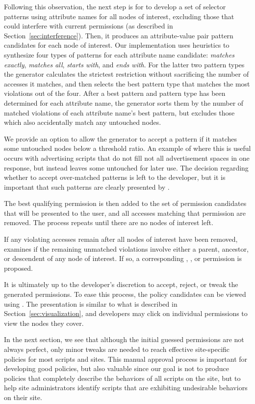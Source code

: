 Following this observation, the next step is for \pg to develop a set of
selector patterns using attribute names for all nodes of interest,
excluding those that could interfere with current permissions (as
described in Section~\ref{sec:interference}).  Then, it produces an
attribute-value pair pattern candidates for each node of interest.  Our
implementation uses heuristics to synthesize four types of patterns for
each attribute name candidate: \emph{matches exactly}, \emph{matches
  all}, \emph{starts with}, and \emph{ends with}.  For the latter two
pattern types the generator calculates the strictest restriction without
sacrificing the number of accesses it matches, and then selects the best
pattern type that matches the most violations out of the four.  After a
best pattern and pattern type has been determined for each attribute
name, the generator sorts them by the number of matched violations of
each attribute name's best pattern, but excludes those which also
accidentally match any untouched nodes.

We provide an option to allow the generator to accept a pattern if it
matches some untouched nodes below a threshold ratio.  An example of
where this is useful occurs with advertising scripts that do not fill
not all advertisement spaces in one response, but instead leaves some
untouched for later use.  The decision regarding whether to accept
over-matched patterns is left to the developer, but it is important that
such patterns are clearly presented by \vis.
 
The best qualifying permission is then added to the set of permission
candidates that will be presented to the user, and all accesses matching
that permission are removed.  The process repeats until there are no
nodes of interest left.

If any violating accesses remain after all nodes of interest have been
removed, \pg examines if the remaining unmatched violations involve
either a parent, ancestor, or descendent of any node of interest.  If
so, a corresponding , , or 
permission is proposed.

It is ultimately up to the developer's discretion to accept, reject, or
tweak the generated permissions.  To ease this process, the policy
candidates can be viewed using \vis.  The presentation is similar to
what is described in Section~\ref{sec:visualization}, and developers may
click on individual permissions to view the nodes they cover.

In the next section, we see that although the initial guessed
permissions are not always perfect, only minor tweaks are needed to
reach effective site-specific policies for most scripts and sites.  This
manual approval process is important for developing good policies, but
also valuable since our goal is not to produce policies that completely
describe the behaviors of all scripts on the site, but to help site
administrators identify scripts that are exhibiting undesirable
behaviors on their site.

